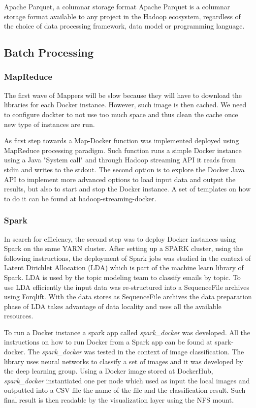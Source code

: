 Apache Parquet, a columnar storage format
Apache Parquet is a columnar storage format available to any project in the Hadoop ecosystem, regardless
of the choice of data processing framework, data model or programming language.

\subsection{Batch Processing}

\subsubsection{MapReduce}
The first wave of Mappers will be slow because they will have to download the libraries for each Docker
instance. However, such image is then cached. We need to configure dockter to not use too much space
and thus clean the cache once new type of instances are run.

As first step towards a Map-Docker function was implemented deployed using MapReduce processing paradigm.
Such function runs a simple Docker instance using a Java "System call" and through Hadoop streaming API
it reads from stdin and writes to the stdout. The second option is to explore the Docker Java API to
implement more advanced options to load input data and output the results, but also to start and stop
the Docker instance. A set of templates on how to do it can be found at hadoop-streaming-docker.

\subsubsection{Spark}
In search for efficiency, the second step was to deploy Docker instances using Spark on the same YARN
cluster. After setting up a SPARK cluster, using the following instructions, the deployment of Spark
jobs was studied in the context of Latent Dirichlet Allocation (LDA) which is part of the machine learn
library of Spark. LDA is used by the topic modeling team to classify emails by topic. To use LDA
efficiently the input data was re-structured into a SequenceFile archives using Forqlift. With the
data stores as SequenceFile archives the data preparation phase of LDA takes advantage of data locality
and uses all the available resources.

To run a Docker instance a spark app called \emph{spark\_docker} was developed. All the instructions
on how to run Docker from a Spark app can be found at spark-docker. The \emph{spark\_docker} was tested
in the context of image classification. The library uses neural networks to classify a set of images
and it was developed by the deep learning group. Using a Docker image stored at DockerHub, \emph{spark\_docker}
instantiated one per node which used as input the local images and outputted into a CSV file the name
of the file and the classification result. Such final result is then readable by the visualization layer
using the NFS mount.


